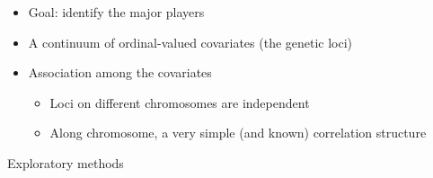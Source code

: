 \documentclass[12pt]{article}
\newcommand{\headsize}{\fontsize{35}{35} \selectfont}
\newcommand{\smallersize}{\fontsize{20}{25} \selectfont}
\newcommand{\smallestsize}{\fontsize{18}{22} \selectfont}
\begin{document}
\vspace{3cm} \color{mywhite} \smallersize

\hfill \begin{minipage}{10in}
\begin{itemize}
\itemsep24pt

\item Goal: identify the major players

\item A continuum of ordinal-valued covariates (the genetic loci)

\item Association among the covariates 
{\color{myblue} \smallestsize
\begin{itemize}
\item Loci on different chromosomes are independent
\item Along chromosome, a very simple (and known) correlation
  structure
\end{itemize} }

\end{itemize}
\end{minipage}





\newpage

\headsize \color{myyellow}
\hfill \begin{minipage}{5.75in}
\centering
Exploratory methods
\end{minipage}

\vspace{3cm} \color{mywhite} \smallersize
\end{document}
